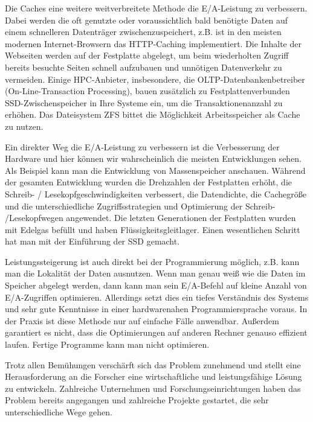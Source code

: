 Die Caches eine weitere weitverbreitete Methode die E/A-Leistung zu verbessern. Dabei werden die oft genutzte oder voraussichtlich bald benötigte Daten auf einem schnelleren Datenträger zwischenzuspeichert, z.B. ist in den meisten modernen Internet-Browsern das HTTP-Caching implementiert. Die Inhalte der Webseiten werden auf der Festplatte abgelegt, um beim wiederholten Zugriff bereits besuchte Seiten schnell aufzubauen und unnötigen Datenverkehr zu vermeiden. Einige HPC-Anbieter, insbesondere, die OLTP-Datenbankenbetreiber (On-Line-Transaction Processing), bauen zusätzlich zu Festplattenverbunden SSD-Zwischenspeicher in Ihre Systeme ein, um die Transaktionenanzahl zu erhöhen. 
Das Dateisystem ZFS bittet die Möglichkeit Arbeitsspeicher als Cache zu nutzen. 

Ein direkter Weg die E/A-Leistung zu verbessern ist die Verbesserung der Hardware und hier können wir wahrscheinlich die meisten Entwicklungen sehen. Als Beispiel kann man die Entwicklung von Massenspeicher anschauen. Während der gesamten Entwicklung wurden die Drehzahlen der Festplatten erhöht, die Schreib- / Lesekopfgeschwindigkeiten verbessert, die Datendichte, die Cachegröße und die unterschiedliche Zugriffsstrategien und Optimierung der Schreib- /Lesekopfwegen angewendet. Die letzten Generationen der Festplatten wurden mit Edelgas befüllt und haben Flüssigkeitsgleitlager. Einen wesentlichen Schritt hat man mit der Einführung der SSD gemacht. 


Leistungssteigerung ist auch direkt bei der Programmierung möglich, z.B. kann man die Lokalität der Daten ausnutzen. Wenn man genau weiß wie die Daten im Speicher abgelegt werden, dann kann man sein E/A-Befehl auf kleine Anzahl von E/A-Zugriffen optimieren. Allerdings setzt dies ein tiefes Verständnis des Systems und sehr gute Kenntnisse in einer hardwarenahen Programmiersprache voraus. In der Praxis ist diese Methode nur auf einfache Fälle anwendbar. Außerdem garantiert es nicht, dass die Optimierungen auf anderen Rechner genauso effizient laufen. Fertige Programme kann man nicht optimieren.

Trotz allen Bemühungen verschärft sich das Problem zunehmend und stellt eine Herausforderung an die Forscher eine wirtschaftliche und leistungsfähige Lösung zu entwickeln. Zahlreiche Unternehmen und Forschungseinrichtungen haben das Problem bereits angegangen und zahlreiche Projekte gestartet, die sehr unterschiedliche Wege gehen.


